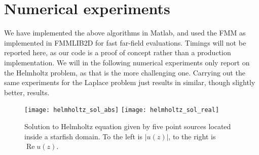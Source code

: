 \documentclass[hidelinks]{siamart1116}
\begin{document}
\section{Numerical experiments}
\label{sec:numer-exper}

We have implemented the above algorithms in Matlab, and used the FMM
as implemented in FMMLIB2D \cite{fmmlib2d} for fast far-field
evaluations. Timings will not be reported here, as our code is a proof
of concept rather than a production implementation. We will in the
following numerical experiments only report on the Helmholtz problem,
as that is the more challenging one. Carrying out the same experiments
for the Laplace problem just results in similar, though slightly
better, results.

\begin{figure}[htbp]
  
  \centering
  \texttt{[image: helmholtz\_sol\_abs]}
  \hspace{.1\textwidth}
  \texttt{[image: helmholtz\_sol\_real]}
  \caption{Solution to Helmholtz equation given by five point sources
    located inside a starfish domain. To the left is $|u(z)|$, to the
    right is ${\operatorname{Re}} u(z)$.}
  \label{fig:helmholtz_sol}
\end{figure}
\end{document}
